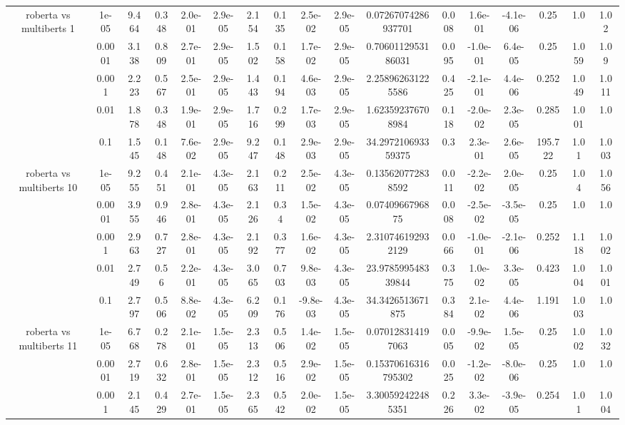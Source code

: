 \begin{tabular}{|c|c|c|c|c|c|c|c|c|c|c|c|c|c|c|c|c|}
\hline
\multirow{5}{*}{roberta  vs multiberts 1} & 1e-05 & 9.464 & 0.348 & 2.0e-01 & 2.9e-05 & 2.154 & 0.135 & 2.5e-02 & 2.9e-05 & 0.07267074286937701 & 0.008 & 1.6e-01 & -4.1e-06 & 0.25 & 1.0 & 1.02 \\
 & 0.0001 & 3.138 & 0.809 & 2.7e-01 & 2.9e-05 & 1.502 & 0.158 & 1.7e-02 & 2.9e-05 & 0.7060112953186031 & 0.095 & -1.0e-01 & 6.4e-05 & 0.25 & 1.059 & 1.09 \\
 & 0.001 & 2.223 & 0.567 & 2.5e-01 & 2.9e-05 & 1.443 & 0.194 & 4.6e-03 & 2.9e-05 & 2.258962631225586 & 0.425 & -2.1e-01 & 4.4e-06 & 0.252 & 1.049 & 1.011 \\
 & 0.01 & 1.878 & 0.348 & 1.9e-01 & 2.9e-05 & 1.716 & 0.299 & 1.7e-03 & 2.9e-05 & 1.623592376708984 & 0.118 & -2.0e-02 & 2.3e-05 & 0.285 & 1.001 & 1.0 \\
 & 0.1 & 1.545 & 0.148 & 7.6e-02 & 2.9e-05 & 9.247 & 0.148 & 2.9e-03 & 2.9e-05 & 34.297210693359375 & 0.3 & 2.3e-01 & 2.6e-05 & 195.722 & 1.01 & 1.003 \\
\hline
\multirow{5}{*}{roberta  vs multiberts 10} & 1e-05 & 9.255 & 0.451 & 2.1e-01 & 4.3e-05 & 2.163 & 0.211 & 2.5e-02 & 4.3e-05 & 0.135620772838592 & 0.011 & -2.2e-02 & 2.0e-05 & 0.25 & 1.04 & 1.056 \\
 & 0.0001 & 3.955 & 0.946 & 2.8e-01 & 4.3e-05 & 2.126 & 0.34 & 1.5e-02 & 4.3e-05 & 0.0740966796875 & 0.008 & -2.5e-02 & -3.5e-05 & 0.25 & 1.0 & 1.0 \\
 & 0.001 & 2.963 & 0.727 & 2.8e-01 & 4.3e-05 & 2.192 & 0.377 & 1.6e-02 & 4.3e-05 & 2.310746192932129 & 0.066 & -1.0e-01 & -2.1e-06 & 0.252 & 1.118 & 1.002 \\
 & 0.01 & 2.749 & 0.56 & 2.2e-01 & 4.3e-05 & 3.065 & 0.703 & 9.8e-03 & 4.3e-05 & 23.978599548339844 & 0.375 & 1.0e-02 & 3.3e-05 & 0.423 & 1.004 & 1.001 \\
 & 0.1 & 2.797 & 0.506 & 8.8e-02 & 4.3e-05 & 6.209 & 0.176 & -9.8e-03 & 4.3e-05 & 34.3426513671875 & 0.384 & 2.1e-02 & 4.4e-06 & 1.191 & 1.003 & 1.0 \\
\hline
\multirow{5}{*}{roberta  vs multiberts 11} & 1e-05 & 6.768 & 0.278 & 2.1e-01 & 1.5e-05 & 2.313 & 0.506 & 1.4e-02 & 1.5e-05 & 0.070128314197063 & 0.005 & -9.9e-02 & 1.5e-05 & 0.25 & 1.002 & 1.032 \\
 & 0.0001 & 2.719 & 0.632 & 2.8e-01 & 1.5e-05 & 2.312 & 0.516 & 2.9e-02 & 1.5e-05 & 0.15370616316795302 & 0.025 & -1.2e-02 & -8.0e-06 & 0.25 & 1.0 & 1.0 \\
 & 0.001 & 2.145 & 0.429 & 2.7e-01 & 1.5e-05 & 2.365 & 0.542 & 2.0e-02 & 1.5e-05 & 3.300592422485351 & 0.226 & 3.3e-02 & -3.9e-05 & 0.254 & 1.01 & 1.004 \\

\end{tabular}

